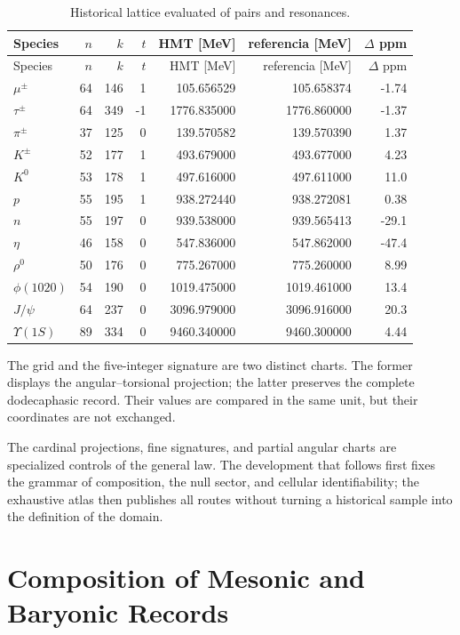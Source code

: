 \begin{longtable}{@{}lrrrrrr@{}}
\caption{Historical lattice evaluated of pairs and resonances.}
\label{tab:rejilla-extendida-resonancias-rev6}\\
\toprule
Species&\(n\)&\(k\)&\(t\)&{HMT [MeV]}&{referencia [MeV]}&{\(\Delta\) ppm}\\
\midrule
\endfirsthead
\toprule
Species&\(n\)&\(k\)&\(t\)&{HMT [MeV]}&{referencia [MeV]}&{\(\Delta\) ppm}\\
\midrule
\endhead
\(\mu^\pm\)&64&146&1&105.656529&105.658374&-1.74\\
\(\tau^\pm\)&64&349&-1&1776.835000&1776.860000&-1.37\\
\(\pi^\pm\)&37&125&0&139.570582&139.570390&1.37\\
\(K^\pm\)&52&177&1&493.679000&493.677000&4.23\\
\(K^0\)&53&178&1&497.616000&497.611000&11.0\\
\(p\)&55&195&1&938.272440&938.272081&0.38\\
\(n\)&55&197&0&939.538000&939.565413&-29.1\\
\(\eta\)&46&158&0&547.836000&547.862000&-47.4\\
\(\rho^0\)&50&176&0&775.267000&775.260000&8.99\\
\(\phi(1020)\)&54&190&0&1019.475000&1019.461000&13.4\\
\(J/\psi\)&64&237&0&3096.979000&3096.916000&20.3\\
\(\Upsilon(1S)\)&89&334&0&9460.340000&9460.300000&4.44\\
\bottomrule
\end{longtable}

The grid and the five-integer signature are two distinct charts. The former
displays the angular--torsional projection; the latter preserves the complete
dodecaphasic record. Their values are compared in the same unit, but their
coordinates are not exchanged.
\fi

The cardinal projections, fine signatures, and partial angular charts
are specialized controls of the general law. The development that follows first fixes
the grammar of composition, the null sector, and cellular identifiability;
the exhaustive atlas then publishes all routes without turning a
historical sample into the definition of the domain.

\section{Composition of Mesonic and Baryonic Records}

